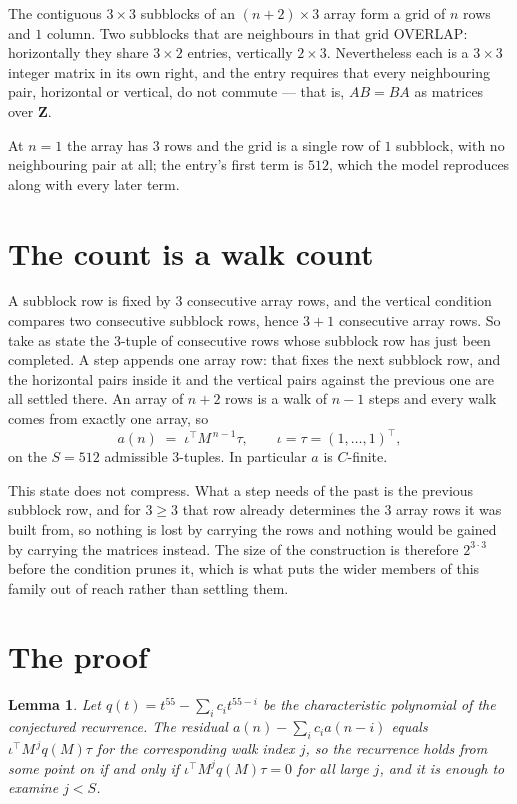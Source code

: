 \documentclass[11pt,a4paper]{article}
\theoremstyle{plain}
\newtheorem{lemma}[theorem]{Lemma}
\theoremstyle{definition}
\begin{document}
The contiguous $3\times3$ subblocks of an $(n+2)\times3$ array form a grid of $n$
rows and $1$ column. Two subblocks that are neighbours in that
grid OVERLAP: horizontally they share $3\times2$ entries, vertically
$2\times3$. Nevertheless each is a $3\times3$ integer matrix in its own right, and
the entry requires that every neighbouring pair, horizontal or vertical, do not commute --- that is,
$AB=BA$ as matrices over $\mathbf{Z}$.

At $n=1$ the array has $3$ rows and the grid is a single row of $1$
subblock, with no neighbouring pair at all; the entry's first term is
$512$, which the model reproduces along with every later term.

\section{The count is a walk count}

A subblock row is fixed by $3$ consecutive array rows, and the vertical condition compares
two consecutive subblock rows, hence $3+1$ consecutive array rows. So take as state the
$3$-tuple of consecutive rows whose subblock row has just been completed. A step appends one
array row: that fixes the next subblock row, and the horizontal pairs inside it and the
vertical pairs against the previous one are all settled there. An array of $n+2$ rows is
a walk of $n-1$ steps and every walk comes from exactly one array, so
\[
a(n)\;=\;\iota^{\!\top}M^{\,n-1}\tau,\qquad\iota=\tau=(1,\dots,1)^{\!\top},
\]
on the $S=512$ admissible $3$-tuples. In particular $a$ is $C$-finite.

This state does not compress. What a step needs of the past is the previous subblock row, and
for $3\ge3$ that row already determines the $3$ array rows it was built from, so nothing
is lost by carrying the rows and nothing would be gained by carrying the matrices instead. The
size of the construction is therefore $2^{3\cdot3}$ before the condition prunes
it, which is what puts the wider members of this family out of reach rather than settling them.

\section{The proof}

\begin{lemma}\label{lem:crit}
Let $q(t)=t^{55}-\sum_i c_it^{55-i}$ be the characteristic polynomial of the
conjectured recurrence. The residual $a(n)-\sum_ic_ia(n-i)$ equals
$\iota^{\!\top}M^{\,j}q(M)\tau$ for the corresponding walk index $j$, so the recurrence
holds from some point on if and only if $\iota^{\!\top}M^{j}q(M)\tau=0$ for all large $j$,
and it is enough to examine $j<S$.
\end{lemma}
\end{document}
